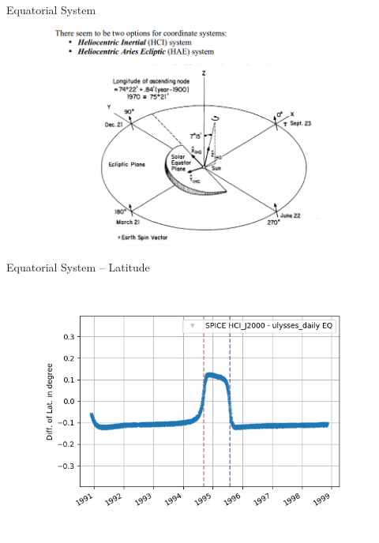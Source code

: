 \documentclass{beamer}
\begin{document}
\begin{frame}{Equatorial System}
\begin{figure}									
	\includegraphics[width=.9\textwidth]{Pics/HELIO_coordsystems.png}
\end{figure}

\end{frame}



\begin{frame}{Equatorial System -- Latitude}
\begin{figure}									
	\includegraphics[width=1\textwidth]{Pics/EQ_LAT.png}
\end{figure}
\end{frame}
\end{document}
